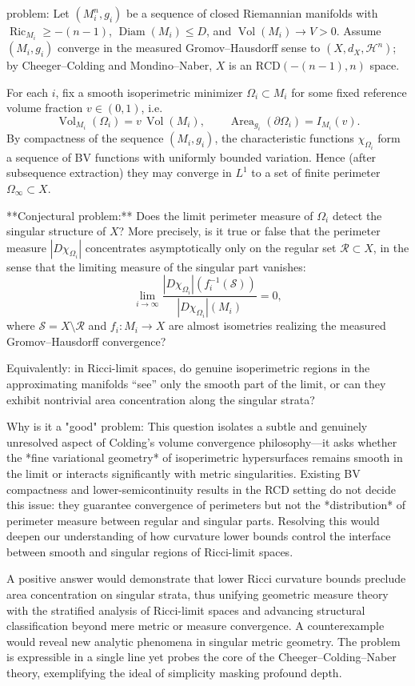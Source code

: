 problem:  
Let \((M_i^n,g_i)\) be a sequence of closed Riemannian manifolds with \(\operatorname{Ric}_{M_i}\ge -(n-1)\), \(\operatorname{Diam}(M_i)\le D\), and \( \operatorname{Vol}(M_i)\to V>0\).  Assume \((M_i,g_i)\) converge in the measured Gromov–Hausdorff sense to \((X,d_X,\mathcal{H}^n)\); by Cheeger–Colding and Mondino–Naber, \(X\) is an \(\mathrm{RCD}(-(n-1),n)\) space.  

For each \(i\), fix a smooth isoperimetric minimizer \(\Omega_i\subset M_i\) for some fixed reference volume fraction \(v\in (0,1)\), i.e.  
\[
\operatorname{Vol}_{M_i}(\Omega_i)=v\,\operatorname{Vol}(M_i),\qquad
\operatorname{Area}_{g_i}(\partial\Omega_i)=I_{M_i}(v). 
\]
By compactness of the sequence \((M_i,g_i)\), the characteristic functions \(\chi_{\Omega_i}\) form a sequence of BV functions with uniformly bounded variation.  Hence (after subsequence extraction) they may converge in \(L^1\) to a set of finite perimeter \(\Omega_\infty\subset X\).  

**Conjectural problem:**  
Does the limit perimeter measure of \(\Omega_i\) detect the singular structure of \(X\)?  More precisely, is it true or false that the perimeter measure \( |D\chi_{\Omega_i}|\) concentrates asymptotically only on the regular set \(\mathcal{R}\subset X\), in the sense that the limiting measure of the singular part vanishes:
\[
\lim_{i\to\infty}\frac{|D\chi_{\Omega_i}|(f_i^{-1}(\mathcal{S}))}{|D\chi_{\Omega_i}|(M_i)} = 0,
\]
where \(\mathcal{S}=X\setminus\mathcal{R}\) and \(f_i:M_i\to X\) are almost isometries realizing the measured Gromov–Hausdorff convergence?  

Equivalently: in Ricci-limit spaces, do genuine isoperimetric regions in the approximating manifolds “see” only the smooth part of the limit, or can they exhibit nontrivial area concentration along the singular strata?  

Why is it a "good" problem:  
This question isolates a subtle and genuinely unresolved aspect of Colding’s volume convergence philosophy—it asks whether the *fine variational geometry* of isoperimetric hypersurfaces remains smooth in the limit or interacts significantly with metric singularities.  Existing BV compactness and lower-semicontinuity results in the RCD setting do not decide this issue: they guarantee convergence of perimeters but not the *distribution* of perimeter measure between regular and singular parts.  Resolving this would deepen our understanding of how curvature lower bounds control the interface between smooth and singular regions of Ricci-limit spaces.  

A positive answer would demonstrate that lower Ricci curvature bounds preclude area concentration on singular strata, thus unifying geometric measure theory with the stratified analysis of Ricci-limit spaces and advancing structural classification beyond mere metric or measure convergence.  A counterexample would reveal new analytic phenomena in singular metric geometry.  The problem is expressible in a single line yet probes the core of the Cheeger–Colding–Naber theory, exemplifying the ideal of simplicity masking profound depth.